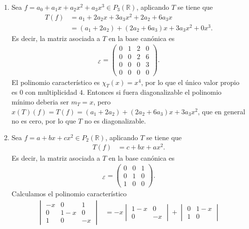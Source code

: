 \documentclass[11pt]{article}
\newcommand{\R}{\mathbb{R}}
\begin{document}
\begin{Solucion}
    \begin{enumerate}
        \item Sea \(f=a_0 +a_1x+a_2x^2+a_3x^3 \in P_3(\R)\), aplicando \(T\) se tiene que
        \begin{align*}
            T(f) &=a_1+2a_2x+3a_3x^2 +2a_2 + 6 a_3x\\
            &=(a_1 + 2a_2) + (2a_2 + 6a_3)x + 3a_3x^2 + 0x^3.
        \end{align*}
        Es decir, la matriz asociada a \(T\) en la base canónica es
        \begin{align*}
            [T]_{\mathcal{E}} = \begin{pmatrix}
                0 & 1 & 2 & 0\\
                0 & 0 & 2 & 6\\
                0 & 0 & 0 & 3\\
                0 & 0 & 0 & 0
            \end{pmatrix}.
        \end{align*}
        El polinomio característico es \(\chi_T(x) = x^4\), por lo que el único valor propio es \(0\) con multiplicidad \(4\). Entonces si fuera diagonalizable 
        el polinomio mínimo deberia ser \(m_{T}=x\), pero \(x(T)(f)=T(f)=(a_1 + 2a_2) + (2a_2 + 6a_3)x + 3a_3x^2\), que en general no es cero, por lo que \(T\) no es diagonalizable.
        \item Sea \(f=a+bx+cx^2 \in P_2(\R)\), aplicando \(T\) se tiene que
        \begin{align*}
            T(f) &= c + bx + a x^2.
        \end{align*}
        Es decir, la matriz asociada a \(T\) en la base canónica es
        \begin{align*}
            [T]_{\mathcal{E}} = \begin{pmatrix}
                0 & 0 & 1\\
                0 & 1 & 0\\
                1 & 0 & 0
            \end{pmatrix}.
        \end{align*}
        Calculamos el polinomio característico
        \begin{align*}
             \begin{vmatrix}
                -x & 0 & 1\\
                0 & 1-x & 0\\
                1 & 0 & -x
            \end{vmatrix}&=-x  \begin{vmatrix} 1-x & 0\\ 0  & -x\end{vmatrix} + \begin{vmatrix} 0 & 1-x\\ 1  & 0 \end{vmatrix}\\

\end{align*}
\end{enumerate}
\end{Solucion}
\end{document}

